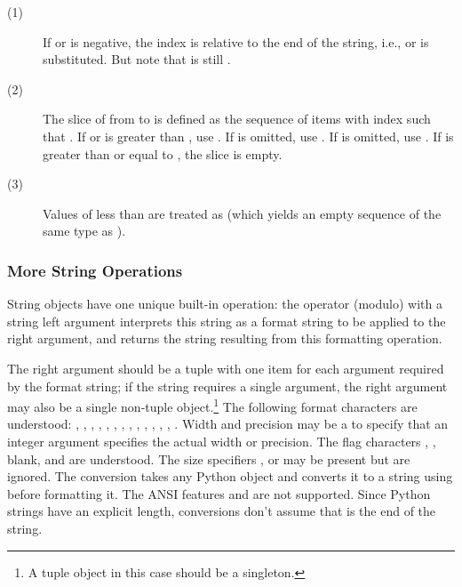 \begin{description}
  
\item[(1)] If  or  is negative, the index is relative to
  the end of the string, i.e.,  or
   is substituted.  But note that  is
  still .
  
\item[(2)] The slice of  from  to  is defined as
  the sequence of items with index  such that .  If  or  is greater than
  , use .  If  is omitted,
  use .  If  is omitted, use .  If
   is greater than or equal to , the slice is empty.

\item[(3)] Values of  less than  are treated as
   (which yields an empty sequence of the same type as
  ).

\end{description}


\subsubsection{More String Operations \label{typesseq-strings}}

String objects have one unique built-in operation: the \code{\%}
operator (modulo) with a string left argument interprets this string
as a \C{}  format string to be applied to the
right argument, and returns the string resulting from this formatting
operation.

The right argument should be a tuple with one item for each argument
required by the format string; if the string requires a single
argument, the right argument may also be a single non-tuple
object.\footnote{A tuple object in this case should be a singleton.}
The following format characters are understood:
\code{\%}, , , , , , ,
, , , , , , . 
Width and precision may be a \code{*} to specify that an integer argument
specifies the actual width or precision.  The flag characters
\code{-}, \code{+}, blank, \code{\#} and  are understood.  The
size specifiers ,  or  may be 
present but are ignored.  The  conversion takes any Python
object and converts it to a string using  before
formatting it.  The ANSI features  and 
are not supported.  Since Python strings have an explicit length,
 conversions don't assume that  is the end of
the string.

